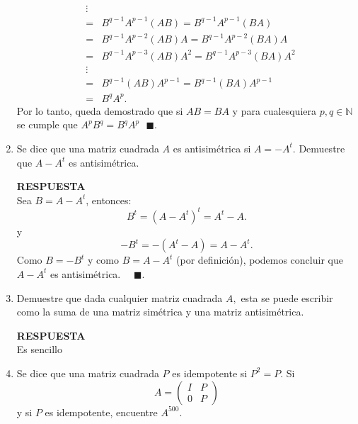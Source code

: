 \documentclass[11pt,letterpaper]{article}
\newcommand{\res}{\textbf{RESPUESTA}\\}
\newcommand{\fin}{$\blacksquare.$}
\newcommand{\finf}{\blacksquare.}
\begin{document}
\begin{enumerate}
\begin{equation*}
\begin{array}{ccc}
&\vdots&\\
&=&B^{q-1}A^{p-1}(AB)=B^{q-1}A^{p-1}(BA)\\
&=&B^{q-1}A^{p-2}(AB)A=B^{q-1}A^{p-2}(BA)A\\
&=&B^{q-1}A^{p-3}(AB)A^2=B^{q-1}A^{p-3}(BA)A^2\\
&\vdots&\\
&=&B^{q-1}(AB)A^{p-1}=B^{q-1}(BA)A^{p-1}\\
&=&B^qA^{p}.
\end{array}
\end{equation*}
Por lo tanto, queda demostrado que si $AB=BA$ y para cualesquiera $p,q\in \mathbb{N}$ se cumple que $A^pB^q=B^qA^p \ \ \ \finf$ 
\item Se dice que una matriz cuadrada $A$ es antisimétrica si $A=-A^t.$ Demuestre que $A-A^t$ es antisimétrica.

\res
Sea $B=A-A^t$, entonces:
$$B^t=(A-A^t)^t=A^t-A.$$
y $$-B^t=-(A^t-A)=A-A^t.$$
Como $B=-B^t$ y como $B=A-A^t$ (por definición), podemos concluir que   $A-A^t$ es antisimétrica. \ \ \fin

\item Demuestre que dada cualquier matriz cuadrada $A,$ esta se puede escribir como la suma de una matriz simétrica y una matriz antisimétrica.

\res
Es sencillo
\item Se dice que una matriz cuadrada $P$ es idempotente si $P^2=P$. Si 
\begin{equation*}
A=\left(\begin{array}{cc}
I& P\\
0&P
\end{array}
\right)
\end{equation*}
y si $P$ es idempotente, encuentre $A^{500}.$


\end{enumerate}
\end{document}
